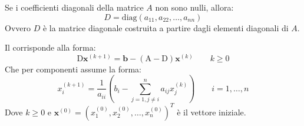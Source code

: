 Se i coefficienti diagonali della matrice $A$ non sono nulli, allora:
\begin{equation*}
    D = \mathrm{diag}\left(a_{11}, a_{22}, \dots, a_{nn}\right)
\end{equation*}
Ovvero $D$ è la matrice diagonale costruita a partire dagli elementi diagonali di $A$. 

\highspace
Il  corrisponde alla forma:
\begin{equation*}
    \mathrm{D}\mathbf{x}^{\left(k+1\right)} = \mathbf{b} - \left(\mathrm{A} - \mathrm{D}\right)\mathbf{x}^{\left(k\right)} \hspace{2em} k \ge 0
\end{equation*}
Che per componenti assume la forma:
\begin{equation}
    x_{i}^{\left(k+1\right)}
    =
    \dfrac{1}{a_{ii}}
    \left(
        b_{i} - \displaystyle\sum_{j=1, j \ne i}^{n} a_{ij} x_{j}^{\left(k\right)}
    \right)
    \hspace{2em}
    i = 1, \dots, n
\end{equation}
Dove $k \ge 0$ e $\mathbf{x}^{\left(0\right)} = \left(x_{1}^{\left(0\right)}, x_{2}^{\left(0\right)}, \dots, x_{n}^{\left(0\right)}\right)^{T}$ è il vettore iniziale.

